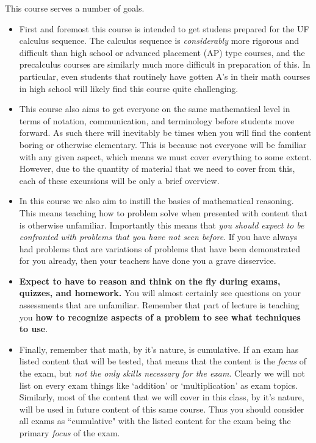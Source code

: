 \documentclass{ximera}
\begin{document}
This course serves a number of goals. 
\begin{itemize}
    \item First and foremost this course is intended to get studens prepared for the UF calculus sequence. The calculus sequence is \textit{considerably} more rigorous and difficult than high school or advanced placement (AP) type courses, and the precalculus courses are similarly much more difficult in preparation of this. In particular, even students that routinely have gotten A's in their math courses in high school will likely find this course quite challenging.
    \item This course also aims to get everyone on the same mathematical level in terms of notation, communication, and terminology before students move forward. As such there will inevitably be times when you will find the content boring or otherwise elementary. This is because not everyone will be familiar with any given aspect, which means we must cover everything to some extent. However, due to the quantity of material that we need to cover from this, each of these excursions will be only a brief overview.
    \item In this course we also aim to instill the basics of mathematical reasoning. This means teaching how to problem solve when presented with content that is otherwise unfamiliar. Importantly this means that \textit{you should expect to be confronted with problems that you have not seen before}. If you have always had problems that are variations of problems that have been demonstrated for you already, then your teachers have done you a grave disservice. 
    \item \textbf{Expect to have to reason and think on the fly during exams, quizzes, and homework.} You will almost certainly see questions on your assessments that are unfamiliar. Remember that part of lecture is teaching you \textbf{how to recognize aspects of a problem to see what techniques to use}.
    \item Finally, remember that math, by it's nature, is cumulative. If an exam has listed content that will be tested, that means that the content is the \textit{focus} of the exam, but \textit{not the only skills necessary for the exam}. Clearly we will not list on every exam things like `addition' or `multiplication' as exam topics. Similarly, most of the content that we will cover in this class, by it's nature, will be used in future content of this same course. Thus you should consider all exams as ``cumulative" with the listed content for the exam being the primary \textit{focus} of the exam.
\end{itemize}
\end{document}
